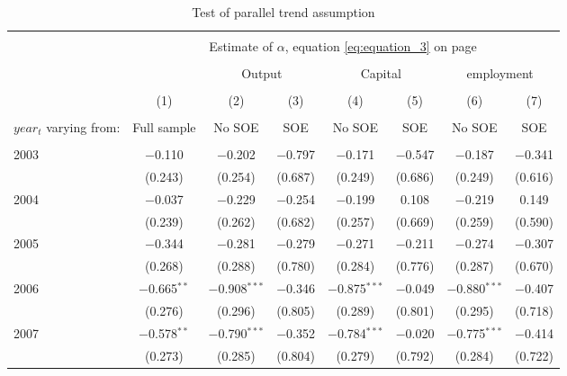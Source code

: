 \documentclass[12pt]{article}
\begin{document}
\begin{table}[!htb] \centering
  \caption{\\ Test of parallel trend assumption} 
\label{table_6}
\begin{adjustbox}{width=\textwidth, totalheight=\baselineskip,keepaspectratio}
\begin{tabular}{@{\extracolsep{5pt}}lccccccc} 
\\[-1.8ex]\hline 
\hline \\[-1.8ex] 
 & \multicolumn{7}{c}{Estimate of $\alpha$, equation \ref{eq:equation_3} on page \pageref{eq:equation_3}} \\ 
\cline{2-8}
            
\\[-1.8ex]
            &\multicolumn{1}{c}{}&\multicolumn{2}{c}{Output}&\multicolumn{2}{c}{Capital}&\multicolumn{2}{c}{employment}\\
\\[-1.8ex] & (1) & (2) & (3) & (4) & (5) & (6) & (7)\\
 \\[-1.8ex]$year_t$ varying from: & Full sample & No SOE & SOE & No SOE & SOE & No SOE & SOE\\
 \hline \\[-1.8ex] 
  2003 & $-$0.110 & $-$0.202 & $-$0.797 & $-$0.171 & $-$0.547 & $-$0.187 & $-$0.341 \\ 
  & (0.243) & (0.254) & (0.687) & (0.249) & (0.686) & (0.249) & (0.616) \\ 
  2004 & $-$0.037 & $-$0.229 & $-$0.254 & $-$0.199 & 0.108 & $-$0.219 & 0.149 \\ 
  & (0.239) & (0.262) & (0.682) & (0.257) & (0.669) & (0.259) & (0.590) \\ 
  2005 & $-$0.344 &  $-$0.281  &  $-$0.279  &   $-$0.271  & $-$0.211 &  $-$0.274 &  $-$0.307 \\ 
  & (0.268) & (0.288) & (0.780) & (0.284) & (0.776) & (0.287) & (0.670) \\ 
  2006 & $-$0.665$^{**}$ & $-$0.908$^{***}$ & $-$0.346 & $-$0.875$^{***}$ & $-$0.049 & $-$0.880$^{***}$ & $-$0.407 \\ 
  & (0.276) & (0.296) & (0.805) & (0.289) & (0.801) & (0.295) & (0.718) \\ 
  2007 & $-$0.578$^{**}$ & $-$0.790$^{***}$ & $-$0.352 & $-$0.784$^{***}$ & $-$0.020 & $-$0.775$^{***}$ & $-$0.414 \\ 
  & (0.273) & (0.285) & (0.804) & (0.279) & (0.792) & (0.284) & (0.722) \\ 

\end{tabular}
\end{adjustbox}
\end{table}
\end{document}
